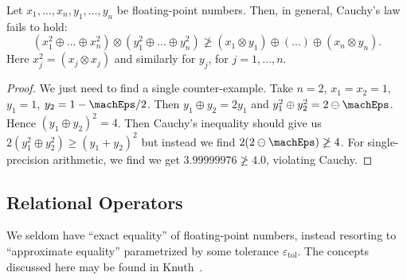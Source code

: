 \begin{prop}
Let $x_{1},\dots,x_{n},y_{1},\dots,y_{n}$ be floating-point
numbers. Then, in general, Cauchy's law fails to hold:
\begin{equation}
  (x_{1}^{2}\oplus\dots\oplus x_{n}^{2})\otimes(y_{1}^{2}\oplus\dots\oplus y_{n}^{2})\not\geq
  (x_{1}\otimes y_{1})\oplus(\dots)\oplus(x_{n}\otimes y_{n}).
\end{equation}
Here $x_{j}^{2}=(x_{j}\otimes x_{j})$ and similarly for $y_{j}$, for $j=1,\dots,n$.
\end{prop}
\begin{proof}
  We just need to find a single counter-example.
  Take $n=2$, $x_{1}=x_{2}=1$, $y_{1}=1$, $y_{2} = 1 - \machEps/2$. Then
  $y_{1}\oplus y_{2}=2y_{1}$
  and $y_{1}^{2}\oplus y_{2}^{2} = 2\ominus\machEps$.
  Hence $(y_{1} \oplus y_{2})^{2} = 4$. Then Cauchy's inequality should
  give us $2(y_{1}^{2}\oplus y_{2}^{2})\geq(y_{1} + y_{2})^{2}$ but
  instead we find $2(2\ominus\machEps)\not\geq 4$. For single-precision
  arithmetic, we find we get $3.99999976\not\geq 4.0$, violating Cauchy.
\end{proof}


\subsection{Relational Operators}

We seldom have ``exact equality'' of floating-point numbers, instead
resorting to ``approximate equality'' parametrized by some tolerance
$\varepsilon_{\text{tol}}$. The concepts discussed here may be found in Knuth~\cite{taocp2}.

